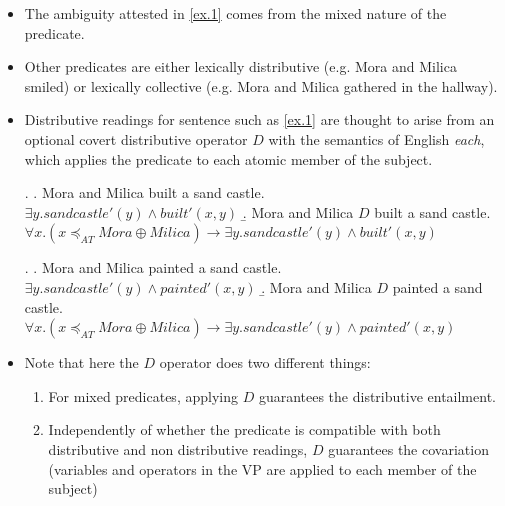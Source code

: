 \documentclass[a4paper]{article}
\begin{document}
\begin{itemize}
\item The ambiguity attested in \ref{ex.1} comes from the mixed nature of the predicate. 
\item Other predicates are either lexically distributive (e.g. Mora and Milica smiled) or lexically collective (e.g. Mora and Milica gathered in the hallway). 
\item Distributive readings for sentence such as \ref{ex.1} are thought to arise from an optional covert distributive operator $D$ with the semantics of English \textit{each}, which applies the predicate to each atomic member of the subject. 

\ex. 
\a. Mora and Milica built a sand castle.\\
        $\exists y.\mathit{sandcastle}'(y) \wedge \textit{built}'(x,y)$
\b. Mora and Milica $D$ built a sand castle.\\
    $\forall x . (x\preceq_{AT}Mora\oplus Milica) \rightarrow \exists y.\mathit{sand castle}'(y) \wedge \textit{built}'(x,y)$


\ex. 
\a. Mora and Milica painted a sand castle.\\
        $\exists y.\mathit{sandcastle}'(y) \wedge \textit{painted}'(x,y)$
\b. Mora and Milica $D$ painted a sand castle.\\
    $\forall x . (x\preceq_{AT}Mora\oplus Milica) \rightarrow \exists y.\mathit{sand castle}'(y) \wedge \textit{painted}'(x,y)$
    
\item Note that here the $D$ operator does two different things:
\begin{enumerate}
\item For mixed predicates, applying $D$ guarantees the distributive entailment.
\item Independently of whether the predicate is compatible with both distributive and non distributive readings, $D$ guarantees the covariation (variables and operators in the VP are applied to each member of the subject)
\end{enumerate}
\end{itemize}
\end{document}
